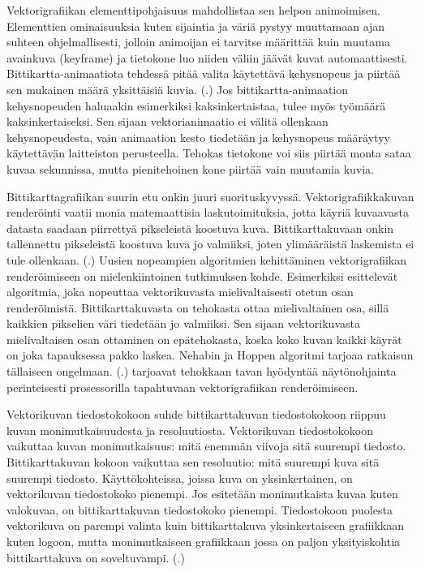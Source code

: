 \documentclass[utf8,bachelor]{gradu3}
\newcommand{\parencitedot}[1]{(\cite{#1}.)}
\begin{document}
Vektorigrafiikan elementtipohjaisuus mahdollistaa sen helpon animoimisen. Elementtien ominaisuuksia kuten sijaintia ja väriä pystyy muuttamaan ajan suhteen ohjelmallisesti, jolloin animoijan ei tarvitse määrittää kuin muutama avainkuva (keyframe) ja tietokone luo niiden väliin jäävät kuvat automaattisesti. Bittikartta-animaatiota tehdessä pitää valita käytettävä kehysnopeus ja piirtää sen mukainen määrä yksittäisiä kuvia. \parencitedot{RefWorks:doc:5bdc5224e4b05afcfde5b159} Jos bittikartta-animaation kehysnopeuden haluaakin esimerkiksi kaksinkertaistaa, tulee myös työmäärä kaksinkertaiseksi. Sen sijaan vektorianimaatio ei välitä ollenkaan kehysnopeudesta, vain animaation kesto tiedetään ja kehysnopeus määräytyy käytettävän laitteiston perusteella. Tehokas tietokone voi siis piirtää monta sataa kuvaa sekunnissa, mutta pienitehoinen kone piirtää vain muutamia kuvia.

Bittikarttagrafiikan suurin etu onkin juuri suorituskyvyssä. Vektorigrafiikkakuvan renderöinti vaatii monia matemaattisia laskutoimituksia, jotta käyriä kuvaavasta datasta saadaan piirrettyä pikseleistä koostuva kuva. Bittikarttakuvaan onkin tallennettu pikseleistä koostuva kuva jo valmiiksi, joten ylimääräistä laskemista ei tule ollenkaan. \parencitedot{RefWorks:doc:5bdc5292e4b05afcfde5b171} Uusien nopeampien algoritmien kehittäminen vektorigrafiikan renderöimiseen on mielenkiintoinen tutkimuksen kohde. Esimerkiksi \textcite{RefWorks:doc:5bdf538de4b04939ba18218f} esittelevät algoritmia, joka nopeuttaa vektorikuvasta mielivaltaisesti otetun osan renderöimistä. Bittikarttakuvasta on tehokasta ottaa mielivaltainen osa, sillä kaikkien pikselien väri tiedetään jo valmiiksi. Sen sijaan vektorikuvasta mielivaltaisen osan ottaminen on epätehokasta, koska koko kuvan kaikki käyrät on joka tapauksessa pakko laskea. Nehabin ja Hoppen algoritmi tarjoaa ratkaisun tällaiseen ongelmaan. \parencitedot{RefWorks:doc:5bdf538de4b04939ba18218f} \textcite{RefWorks:doc:5bc4a5cce4b080e02f7eff1b} tarjoavat tehokkaan tavan hyödyntää näytönohjainta perinteisesti prosessorilla tapahtuvaan vektorigrafiikan renderöimiseen.

Vektorikuvan tiedostokokoon suhde bittikarttakuvan tiedostokokoon riippuu kuvan monimutkaisuudesta ja resoluutiosta. Vektorikuvan tiedostokokoon vaikuttaa kuvan monimutkaisuus: mitä enemmän viivoja sitä suurempi tiedosto. Bittikarttakuvan kokoon vaikuttaa sen resoluutio: mitä suurempi kuva sitä suurempi tiedosto. Käyttökohteissa, joissa kuva on yksinkertainen, on vektorikuvan tiedostokoko pienempi. Jos esitetään monimutkaista kuvaa kuten valokuvaa, on bittikarttakuvan tiedostokoko pienempi. Tiedostokoon puolesta vektorikuva on parempi valinta kuin bittikarttakuva yksinkertaiseen grafiikkaan kuten logoon, mutta monimutkaiseen grafiikkaan jossa on paljon yksityiskohtia bittikarttakuva on soveltuvampi. \parencitedot{RefWorks:doc:5bdf4af9e4b0f02deeb8a48a}
\end{document}
